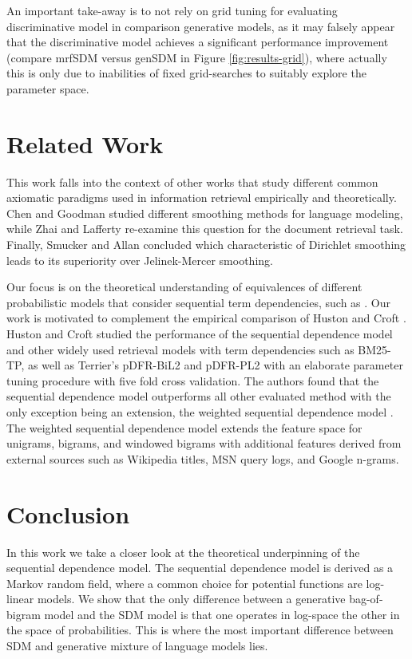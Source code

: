 \documentclass[]{article}
\begin{document}
An important take-away is to not rely on grid tuning for evaluating discriminative model in comparison generative models, as it may falsely appear that the discriminative model achieves a significant performance improvement (compare mrfSDM versus genSDM in Figure \ref{fig:results-grid}), where actually this is only due to inabilities of fixed grid-searches to suitably explore the parameter space.


\section{Related Work}

\label{sec:Related-work}This work falls into the context of other
works that study different common axiomatic paradigms \cite{zhai2011axiomatic}  used in information retrieval
empirically and theoretically. Chen and Goodman \cite{chen1996smoothing}
studied different smoothing methods for language modeling, while Zhai
and Lafferty \cite{zhai2001smoothing} re-examine this question for
the document retrieval task. Finally, Smucker and Allan \cite{smucker2006smoothing}
concluded which characteristic of Dirichlet smoothing leads to its
superiority over Jelinek-Mercer smoothing.

Our focus is on the theoretical understanding of equivalences of different probabilistic models that consider sequential term dependencies, such as \cite{metzler2005sdm}. Our work is motivated to complement the empirical comparison
of Huston and Croft \cite{huston2013termdependencies,huston2014termdepedencies-appendix}.
Huston and Croft studied the performance of the sequential dependence
model and other widely used retrieval models with term dependencies
such as BM25-TP, as well as Terrier's pDFR-BiL2 and pDFR-PL2 with
an elaborate parameter tuning procedure with five fold cross validation.
The authors found that the sequential dependence model outperforms
all other evaluated method with the only exception being an extension,
the weighted sequential dependence model \cite{bendersky2010wsdm}.
The weighted sequential dependence model extends the feature space
for unigrams, bigrams, and windowed bigrams with additional features
derived from external sources such as Wikipedia titles, MSN query
logs, and Google n-grams.

\section{Conclusion}

In this work we take a closer look at the theoretical underpinning
of the sequential dependence model. The sequential dependence model
is derived as a Markov random field, where a common choice for potential
functions are log-linear models. We show that the only difference
between a generative bag-of-bigram model and the SDM model is that
one operates in log-space the other in the space of probabilities.
This is where the most important difference between SDM and generative
mixture of language models lies. 
\end{document}
